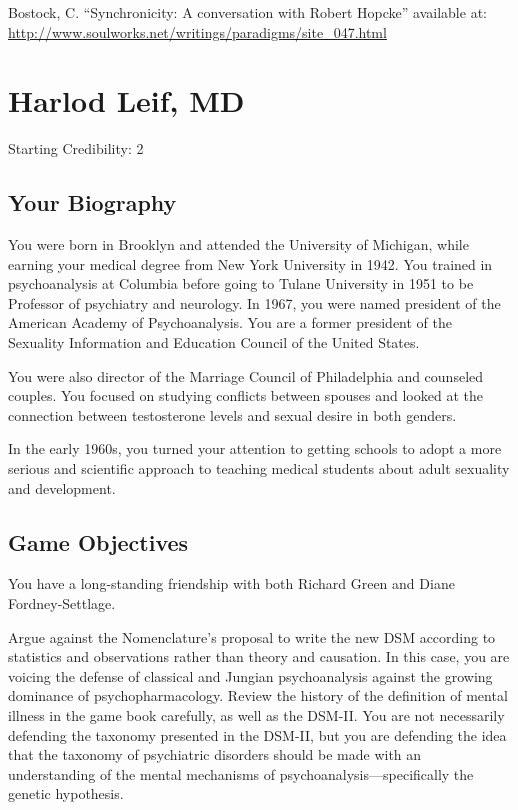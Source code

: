 \begin{refsection}
Bostock, C. “Synchronicity: A conversation with Robert Hopcke” available at: \url{http://www.soulworks.net/writings/paradigms/site_047.html}

\chapter{Harlod Leif, MD}
\label{harlodleifmd}

Starting Credibility: 2

\section{Your Biography}
\label{yourbiography}

You were born in Brooklyn and attended the University of Michigan, while earning your medical degree from New York University in 1942. You trained in psychoanalysis at Columbia before going to Tulane University in 1951 to be Professor of psychiatry and neurology. In 1967, you were named president of the American Academy of Psychoanalysis. You are a former president of the Sexuality Information and Education Council of the United States.

You were also director of the Marriage Council of Philadelphia and counseled couples. You focused on studying conflicts between spouses and looked at the connection between testosterone levels and sexual desire in both genders.

In the early 1960s, you turned your attention to getting schools to adopt a more serious and scientific approach to teaching medical students about adult sexuality and development.

\section{Game Objectives}
\label{gameobjectives}

You have a long-standing friendship with both Richard Green and Diane Fordney-Settlage.

Argue against the Nomenclature's proposal to write the new DSM according to statistics and observations rather than theory and causation. In this case, you are voicing the defense of classical and Jungian psychoanalysis against the growing dominance of psychopharmacology. Review the history of the definition of mental illness in the game book carefully, as well as the DSM-II. You are not necessarily defending the taxonomy presented in the DSM-II, but you are defending the idea that the taxonomy of psychiatric disorders should be made with an understanding of the mental mechanisms of psychoanalysis—specifically the genetic hypothesis.


\end{refsection}
